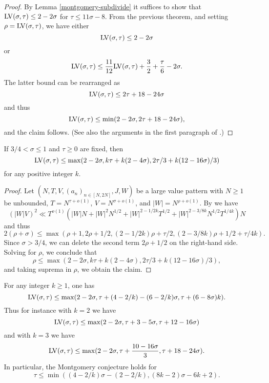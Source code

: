 \literature
{}

\begin{proof}  By Lemma \ref{montgomery-subdivide} it suffices to show that $\mathrm{LV}(\sigma,\tau) \leq 2-2\sigma$ for $\tau \leq 11\sigma-8$.  From the previous theorem, and setting $\rho = \mathrm{LV}(\sigma,\tau)$, we have either
$$ \mathrm{LV}(\sigma,\tau) \leq 2-2\sigma$$
or
$$ \mathrm{LV}(\sigma,\tau) \leq \frac{11}{12}\mathrm{LV}(\sigma,\tau) + \frac{3}{2} + \frac{\tau}{6} - 2\sigma.$$
The latter bound can be rearranged as
$$ \mathrm{LV}(\sigma,\tau) \leq 2\tau + 18 - 24\sigma$$
and thus
$$ \mathrm{LV}(\sigma,\tau) \leq \min( 2-2\sigma, 2\tau + 18 - 24\sigma),$$
and the claim follows.  (See also the arguments in the first paragraph of \cite[p. 226]{heathbrown_zero_1979}.)
\end{proof}


\begin{lemma}\label{hb-lvt-2} If $3/4 < \sigma \leq 1$ and $\tau \geq 0$ are fixed, then
    $$ \mathrm{LV}(\sigma,\tau) \leq \max( 2-2\sigma, k\tau + k(2-4\sigma), 2\tau/3 + k(12-16\sigma)/3 )$$
    for any positive integer $k$.
    \end{lemma}

\begin{proof} Let $(N,T,V,(a_n)_{n \in [N,2N]},J,W)$ be a large value pattern with $N \geq 1$ be unbounded, $T = N^{\tau + o(1)}$,  $V = N^{\sigma + o(1)}$, and $|W| = N^{\rho+o(1)}$. By \cite[Lemma~6]{heathbrown_large_1979} we have
    $$ (|W| V)^2 \ll T^{o(1)}( |W|N + |W|^2 N^{1/2} + |W|^{2-1/2k} T^{1/2} + |W|^{2-3/8k} N^{1/2} T^{1/4k}) N$$
and thus
$$ 2(\rho + \sigma) \leq \max( \rho+1, 2\rho+1/2, (2-1/2k)\rho + \tau/2, (2-3/8k)\rho + 1/2 + \tau/4k).$$
Since $\sigma > 3/4$, we can delete the second term $2\rho+1/2$ on the right-hand side. Solving for $\rho$, we conclude that
$$ \rho \leq \max( 2-2\sigma, k\tau + k(2-4\sigma), 2\tau/3 + k(12-16\sigma)/3 ),$$
and taking suprema in $\rho$, we obtain the claim.
\end{proof}

\begin{theorem}\label{jutila-lvt}  For any integer $k \geq 1$, one has
$$ \mathrm{LV}(\sigma,\tau) \leq \max(2-2\sigma, \tau + (4-2/k) - (6-2/k)\sigma, \tau + (6-8\sigma)k).$$
Thus for instance with $k=2$ we have
$$ \mathrm{LV}(\sigma,\tau) \leq \max(2-2\sigma, \tau + 3 - 5\sigma, \tau + 12-16\sigma)$$
and with $k=3$ we have
$$ \mathrm{LV}(\sigma,\tau) \leq \max(2-2\sigma, \tau + \frac{10-16\sigma}{3}, \tau + 18-24\sigma).$$
In particular, the Montgomery conjecture holds for
$$ \tau \leq \min( (4-2/k)\sigma - (2-2/k), (8k-2)\sigma - 6k + 2).$$
\end{theorem}

